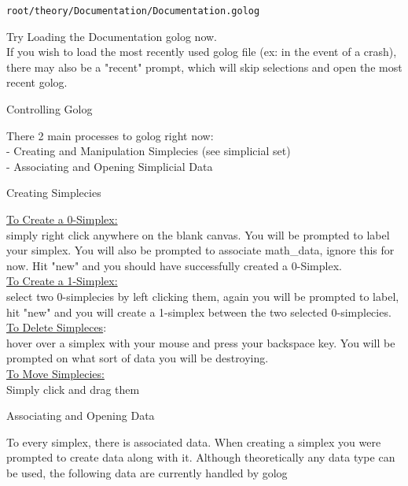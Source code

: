 \documentclass{article}
\begin{document}
\begin{lstlisting}
root/theory/Documentation/Documentation.golog
\end{lstlisting}

Try Loading the Documentation golog now.\\

If you wish to load the most recently used golog file (ex: in the event of a crash), there may also be a "recent" prompt, which will skip selections and open the most recent golog.

\begin{section}{Controlling Golog}
\end{section}

There 2 main processes to golog right now:\\
- Creating and Manipulation Simplecies (see simplicial set)\\
- Associating and Opening Simplicial Data\\

\begin{subsection} {Creating Simplecies}
\end{subsection}
\underline{To Create a 0-Simplex:}\\ simply right click anywhere on the blank canvas. You will be prompted to label your simplex. You will also be prompted to associate math\_data, ignore this for now. Hit "new" and you should have successfully created a 0-Simplex. \\

\underline{To Create a 1-Simplex:}\\
select two 0-simplecies by left clicking them, again you will be prompted to label, hit "new" and you will create a 1-simplex between the two selected 0-simplecies.\\

\underline{To Delete Simpleces}: \\
hover over a simplex with your mouse and press your backspace key. You will be prompted on what sort of data you will be destroying.\\

\underline{To Move Simplecies:} \\
Simply click and drag them\\


\begin{subsection}{Associating and Opening Data}
\end{subsection}
To every simplex, there is associated data. When creating a simplex you were prompted to create data along with it. Although theoretically any data type can be used, the following data are currently handled by golog 
\end{document}
